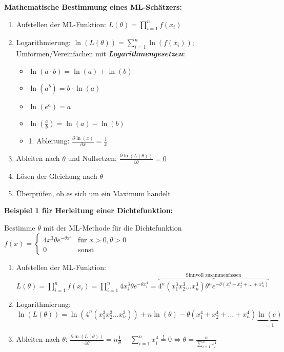 \textbf{Mathematische Bestimmung eines ML-Schätzers:}

\begin{enumerate}
    \item Aufstellen der ML-Funktion: \(L(\theta)=\prod_{i=1}^{n}f(x_i)\)
    \item Logarithmierung: \(\ln(L(\theta))=\sum_{i=1}^{n}\ln(f(x_i))\); Umformen/Vereinfachen mit \textbf{\emph{Logarithmengesetzen}}:
        \begin{itemize}
            \item \(\ln(a\cdot b)=\ln(a)+\ln(b)\)
            \item \(\ln(a^b)=b\cdot\ln(a)\)
            \item \(\ln(e^a)=a\)
            \item \(\ln(\frac{a}{b})=\ln(a)-\ln(b)\)
            \item 1. Ableitung: \(\frac{\partial \ln(x)}{\partial x} = \frac{1}{x}\)
        \end{itemize}
    \item Ableiten nach \(\theta\) und Nullsetzen: \(\frac{\partial \ln(L(\theta))}{\partial \theta}=0\)
    \item Lösen der Gleichung nach \(\theta\)
    \item Überprüfen, ob es sich um ein Maximum handelt
\end{enumerate}

\textbf{Beispiel 1 für Herleitung einer Dichtefunktion:}

Bestimme \(\theta\) mit der ML-Methode für die Dichtefunktion\\

\(f(x) = \begin{cases}
    4x^3\theta e^{-\theta x^4} & \text{für } x>0, \theta>0\\
    0 & \text{sonst}
\end{cases}\)\\

\begin{enumerate}
    \item Aufstellen der ML-Funktion: \(L(\theta)=\prod_{i=1}^{n}f(x_i)=\prod_{i=1}^{n}4x_i^3\theta e^{-\theta x_i^4}=\overbrace{4^n(x_1^3x_2^3\hdots x_n^3)\theta^n e^{-\theta(x_1^4+x_2^4+\hdots+x_n^4)}}^{\text{Sinnvoll zusammenfassen}}\)
    \item Logarithmierung: \(\ln(L(\theta))=\ln(4^n(x_1^3x_2^3\hdots x_n^3))+n\ln(\theta)-\theta(x_1^4+x_2^4+\hdots+x_n^4)\underbrace{\ln(e)}_{=1}\)
    \item Ableiten nach \(\theta\): \(\frac{\partial \ln(L(\theta))}{\partial \theta}=n\frac{1}{\theta}-\sum_{i=1}^{n}x_i^4\stackrel{!}{=}0\Leftrightarrow \theta=\frac{n}{\sum_{i=1}^{n}x_i^4}\)
\end{enumerate}



